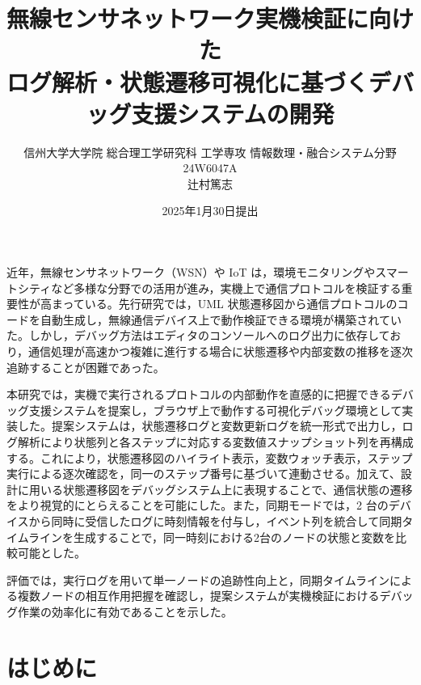 \documentclass[12pt]{jreport}
\title{
\bf 	無線センサネットワーク実機検証に向けた \\
ログ解析・状態遷移可視化に基づくデバッグ支援システムの開発 \\
}
\date{
2025年1月30日提出
}
\author{
信州大学大学院 総合理工学研究科 工学専攻 情報数理・融合システム分野 \\ 
24W6047A\\
辻村篤志 \\
}
\begin{document}
\maketitle
\maegaki

\begin{jabstract} %
近年，無線センサネットワーク（WSN）や IoT は，環境モニタリングやスマートシティなど多様な分野での活用が進み，実機上で通信プロトコルを検証する重要性が高まっている。先行研究では，UML 状態遷移図から通信プロトコルのコードを自動生成し，無線通信デバイス上で動作検証できる環境が構築されていた。しかし，デバッグ方法はエディタのコンソールへのログ出力に依存しており，通信処理が高速かつ複雑に進行する場合に状態遷移や内部変数の推移を逐次追跡することが困難であった。

本研究では，実機で実行されるプロトコルの内部動作を直感的に把握できるデバッグ支援システムを提案し，ブラウザ上で動作する可視化デバッグ環境として実装した。提案システムは，状態遷移ログと変数更新ログを統一形式で出力し，ログ解析により状態列と各ステップに対応する変数値スナップショット列を再構成する。これにより，状態遷移図のハイライト表示，変数ウォッチ表示，ステップ実行による逐次確認を，同一のステップ番号に基づいて連動させる。加えて、設計に用いる状態遷移図をデバッグシステム上に表現することで、通信状態の遷移をより視覚的にとらえることを可能にした。また，同期モードでは，2 台のデバイスから同時に受信したログに時刻情報を付与し，イベント列を統合して同期タイムラインを生成することで，同一時刻における2台のノードの状態と変数を比較可能とした。

評価では，実行ログを用いて単一ノードの追跡性向上と，同期タイムラインによる複数ノードの相互作用把握を確認し，提案システムが実機検証におけるデバッグ作業の効率化に有効であることを示した。
\end{jabstract}



\maetsuke
\tableofcontents
\listoffigures
\listoftables

\hombun

\chapter{はじめに} 
\end{document}
